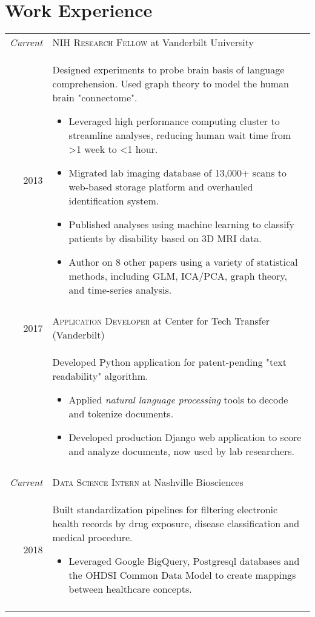 \documentclass[a4paper,11pt]{article}
\begin{document}
\section{Work Experience}
\begin{longtable}{r|p{11.5cm}}
 	\emph{Current} & \textsc{NIH Research Fellow} at Vanderbilt University \\*
 	2013 & \small{Designed experiments to probe brain basis of language comprehension. Used graph theory to model the human brain "connectome".} \footnotesize{
 	\begin{itemize}[itemsep=1pt,topsep=2pt]
    	\item Leveraged high performance computing cluster to streamline analyses, reducing human wait time from \textgreater 1 week to \textless 1 hour.
    	\item Migrated lab imaging database of 13,000+ scans to web-based storage platform and overhauled identification system.
    	\item Published analyses using machine learning to classify patients by disability based on 3D MRI data. \href{https://www.ncbi.nlm.nih.gov/pmc/articles/PMC5061587/}{\color{blue}\Mundus}
    	\item Author on 8 other papers using a variety of statistical methods, including GLM, ICA/PCA, graph theory, and time-series analysis. \href{https://scholar.google.com/citations?user=s3nPF1MAAAAJ&hl=en}{\color{blue}\Mundus}
	\end{itemize} } \\*
	\\
    
 	2017 & \textsc{Application Developer} at Center for Tech Transfer (Vanderbilt) \\*
	& \small{Developed Python application for patent-pending "text readability" algorithm.}
	\footnotesize{
	\begin{itemize}[itemsep=1pt,topsep=2pt]
	    \item Applied \textit{natural language processing} tools to decode and tokenize documents.
	    \item Developed production Django web application to score and analyze documents, now used by lab researchers.
    \end{itemize}}\\*
 	 \\

    
	\emph{Current} & \textsc{Data Science Intern} at Nashville Biosciences \\*
	2018 & \small{Built standardization pipelines for filtering electronic health records by drug exposure, disease classification and medical procedure.}
	\footnotesize{
	\begin{itemize}[itemsep=1pt,topsep=2pt]
	    \item Leveraged Google BigQuery, Postgresql databases and the OHDSI Common Data Model to create mappings between healthcare concepts.
    \end{itemize}}\\*
	 \\
 	

\end{longtable}
\end{document}
